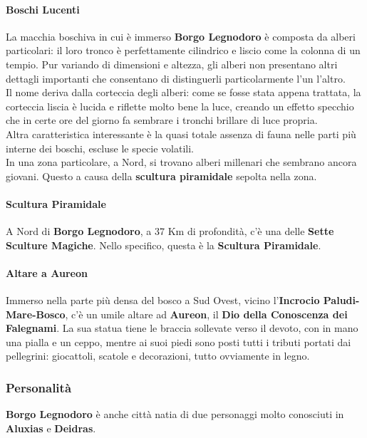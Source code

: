 \documentclass[10pt,twoside,onecolumn,openany]{book}
\begin{document}
\paragraph{Boschi Lucenti} La macchia boschiva in cui è immerso \textbf{Borgo Legnodoro} è composta da alberi particolari: il loro tronco è perfettamente cilindrico e liscio come la colonna di un tempio. Pur variando di dimensioni e altezza, gli alberi non presentano altri dettagli importanti che consentano di distinguerli particolarmente l'un l'altro.\\
Il nome deriva dalla corteccia degli alberi: come se fosse stata appena trattata, la corteccia liscia è lucida e riflette molto bene la luce, creando un effetto specchio che in certe ore del giorno fa sembrare i tronchi brillare di luce propria.\\
Altra caratteristica interessante è la quasi totale assenza di fauna nelle parti più interne dei boschi, escluse le specie volatili.\\
In una zona particolare, a Nord, si trovano alberi millenari che sembrano ancora giovani. Questo a causa della \textbf{scultura piramidale} sepolta nella zona.
\begin{multicols}{2}
\paragraph{Scultura Piramidale}
A Nord di \textbf{Borgo Legnodoro}, a 37 Km di profondità, c'è una delle \textbf{Sette Sculture Magiche}. Nello specifico, questa è la \textbf{Scultura Piramidale}.
\columnbreak
\paragraph{Altare a Aureon}
Immerso nella parte più densa del bosco a Sud Ovest, vicino l'\textbf{Incrocio Paludi-Mare-Bosco}, c'è un umile altare ad \textbf{Aureon}, il \textbf{Dio della Conoscenza dei Falegnami}. La sua statua tiene le braccia sollevate verso il devoto, con in mano una pialla e un ceppo, mentre ai suoi piedi sono posti tutti i tributi portati dai pellegrini: giocattoli, scatole e decorazioni, tutto ovviamente in legno.\\
\end{multicols}
\subsubsection{Personalità}
\textbf{Borgo Legnodoro} è anche città natia di due personaggi molto conosciuti in \textbf{Aluxias} e \textbf{Deidras}.
\end{document}

